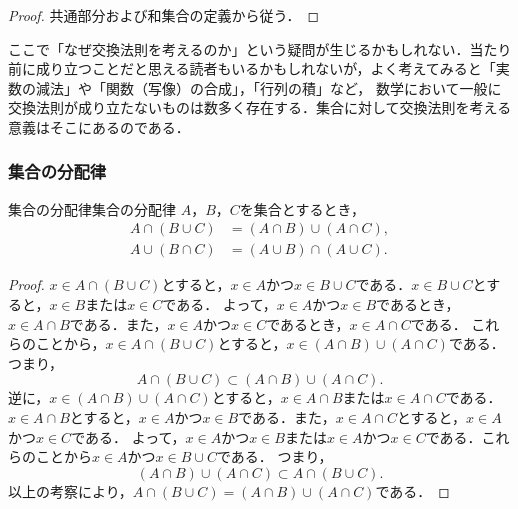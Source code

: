 \documentclass[a4paper,11pt]{ltjsarticle}
\newenvironment{tleftbar}{\begin{tbleftline}\setlength{\parindent}{1\zw}}{\end{tbleftline}}
\begin{document}
\begin{tleftbar}
  \begin{proof}
    共通部分および和集合の定義から従う．
  \end{proof}
\end{tleftbar}

\begin{mycolumn}
  ここで「なぜ交換法則を考えるのか」という疑問が生じるかもしれない．当たり前に成り立つことだと思える読者もいるかもしれないが，よく考えてみると「実数の減法」や「関数（写像）の合成」，「行列の積」など，
  数学において一般に交換法則が成り立たないものは数多く存在する．集合に対して交換法則を考える意義はそこにあるのである．
\end{mycolumn}

\subsubsection{集合の分配律}

\begin{prop}{集合の分配律}{集合の分配律}
  $A$，$B$，$C$を集合とするとき，
  \begin{align*}
    A \cap ( B \cup C) & = (A \cap B) \cup (A \cap C), \\
    A \cup ( B \cap C) & = (A \cup B) \cap (A \cup C).
  \end{align*}
\end{prop}

\begin{tleftbar}
  \begin{proof}
    $ x \in A \cap ( B \cup C)$とすると，$x \in A$かつ$x \in B \cup C$である．$x \in B \cup C$とすると，$x \in B$または$x \in C$である．
    よって，$x \in A$かつ$x \in B$であるとき，$x \in A \cap B$である．また，$x \in A$かつ$x \in C$であるとき，$x \in A \cap C$である．
    これらのことから，$x \in A \cap ( B \cup C)$とすると，$x \in (A \cap B) \cup (A \cap C)$である．
    つまり，
    \[
      A \cap ( B \cup C) \subset (A \cap B) \cup (A \cap C).
    \]
    逆に，$x \in (A \cap B) \cup (A \cap C)$とすると，$x \in A \cap B$または$x \in A \cap C$である．
    $x \in A \cap B$とすると，$x \in A$かつ$x \in B$である．また，$x \in A \cap C$とすると，$x \in A$かつ$x \in C$である．
    よって，$x \in A$かつ$x \in B$または$x \in A$かつ$x \in C$である．これらのことから$x \in A$かつ$x \in B \cup C$である．
    つまり，
    \[
      (A \cap B) \cup (A \cap C) \subset A \cap ( B \cup C).
    \]
    以上の考察により，$A \cap ( B \cup C) = (A \cap B) \cup (A \cap C)$である．
  \end{proof}
\end{tleftbar}
\end{document}
